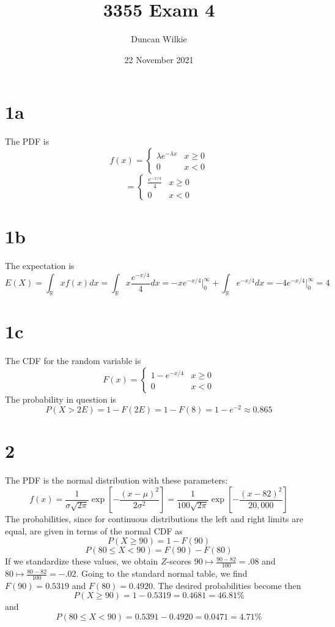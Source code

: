 \documentclass{article}
\title{3355 Exam 4}
\author{Duncan Wilkie}
\date{22 November 2021}
\begin{document}
\maketitle

\section*{1a}
The PDF is
\[f(x)=\begin{cases}\lambda e^{-\lambda x} & x\geq 0 \\ 0 & x < 0\end{cases}\]
\[=\begin{cases}\frac{e^{-x/4}}{4} & x\geq 0 \\ 0 & x < 0\end{cases}\]

\section*{1b}
The expectation is
\[E(X)=\int_\mathbb{R}xf(x)dx=\int_\mathbb{R}x\frac{e^{-x/4}}{4}dx
  =-x{e^{-x/4}}\bigg|_{0}^\infty+\int_\mathbb{R}e^{-x/4}dx = -4e^{-x/4}\bigg|_0^\infty=4\]

\section*{1c}
The CDF for the random variable is
\[F(x)=\begin{cases}
    1-e^{- x/4} & x\geq 0 \\
    0 & x < 0
  \end{cases}\]
The probability in question is
\[P(X > 2E) =1-F(2E)=1-F(8)=1-e^{-2}\approx0.865\]

\section*{2}
The PDF is the normal distribution with these parameters:
\[f(x)=\frac{1}{\sigma\sqrt{2\pi}}\exp\left[ -\frac{(x-\mu)^2}{2\sigma^2} \right]=\frac{1}{100\sqrt{2\pi}}\exp\left[ -\frac{(x-82)^2}{20,000} \right]\]
The probabilities, since for continuous distributions the left and right limits are equal, are given in terms of the normal CDF as
\[P(X\geq 90)=1-F(90)\]
\[P(80\leq X< 90)=F(90)-F(80)\]
If we standardize these values, we obtain $Z$-scores $90\mapsto \frac{90-82}{100}=.08$ and $80\mapsto \frac{80-82}{100}=-.02$. Going to the standard normal table, we find $F(90)=0.5319$ and $F(80)=0.4920$. The desired probabilities become then
\[P(X\geq 90)=1-0.5319=0.4681=46.81\%\]
and
\[P(80\leq X<90)=0.5391-0.4920=0.0471=4.71\%\]
\end{document}
